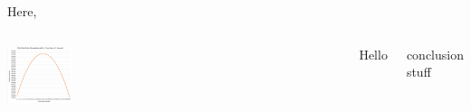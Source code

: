 \documentclass[25pt, a0paper, portrait]{tikzposter}
\begin{document}
\begin{columns}
    {
        Here, \blindtext
    }   
    {
        
    }
\end{columns}


\begin{columns}
    {
        \begin{tikzfigure}
            \includegraphics[width=0.2\textwidth, left]{images/PSM5 TS1 Plot.png}
        \end{tikzfigure}
        Hello
    }
    {
        \blindtext
    }
    {
        conclusion stuff
    }
\end{columns}
{
    \blindtext
}
\end{document}
